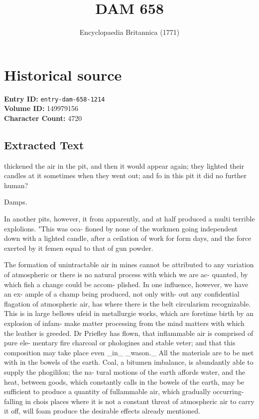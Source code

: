 \documentclass{article}
\title{DAM  658}
\date{Encyclopaedia Britannica (1771)}
\begin{document}
\maketitle

\section*{Historical source}
\textbf{Entry ID:} \texttt{entry-dam-658-1214} \\
\textbf{Volume ID:} 149979156 \\
\textbf{Character Count:} 4720

\subsection*{Extracted Text}
thickened the air in the pit, and then it would appear again; they lighted their candles at it sometimes when they went out; and fo in this pit it did no further human?

Damps.

In another pits, however, it from apparently, and at half produced a multi terrible explolions. "This was oca- fioned by none of the workmen going independent down with a lighted candle, after a ceilation of work for form days, and the force exerted by it femen equal to that of gun powder.

The formation of unintractable air in mines cannot be attributed to any variation of atmospheric or there is no natural process with which we are ac- quanted, by which fish a change could be accom- plished. In one influence, however, we have an ex- ample of a champ being produced, not only with- out any confidential flagation of atmospheric air, has where there is the belt circularism recognizable. This is in large bellows ufeid in metallurgie works, which are foretime birth by an explosion of infam- make matter processing from the mind matters with which the leather is greeded. Dr Priefley has flown, that inflammable air is comprised of pure ele- mentary fire charcoal or phologines and stable veter; and that this composition may take place even \_in\_ \_wason.\_ All the materials are to be met with in the bowels of the earth. Coal, a bitumen imbalance, is abundantly able to supply the phogililon; the na- tural motions of the earth affords water, and the heat, between goods, which constantly calls in the bowels of the earth, may be sufficient to produce a quantity of fullammable air, which gradually occurring- falling in chois places where it is not a constant threat of atmospheric air to carry it off, will foam produce the desirable effects already mentioned.
\end{document}
